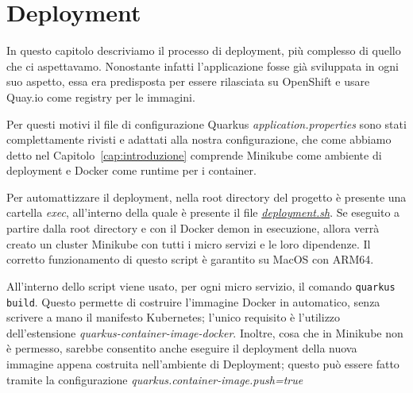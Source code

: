 \chapter{Deployment}
In questo capitolo descriviamo il processo di deployment, più complesso di quello che ci aspettavamo. Nonostante infatti l'applicazione fosse già sviluppata in ogni suo aspetto, essa era predisposta per essere rilasciata su OpenShift e usare Quay.io come registry per le immagini.

Per questi motivi il file di configurazione Quarkus \textit{application.properties} sono stati complettamente rivisti e adattati alla nostra configurazione, che come abbiamo detto nel Capitolo~\ref{cap:introduzione} comprende Minikube come ambiente di deployment e Docker come runtime per i container.

\myskip

Per automattizzare il deployment, nella root directory del progetto è presente una cartella \textit{exec}, all'interno della quale è presente il file \href{https://github.com/edoardosarri24/quarkus-car-rental/blob/master/exec/deployment.sh}{\textit{deployment.sh}}. Se eseguito a partire dalla root directory e con il Docker demon in esecuzione, allora verrà creato un cluster Minikube con tutti i micro servizi e le loro dipendenze. Il corretto funzionamento di questo script è garantito su MacOS con ARM64.

All'interno dello script viene usato, per ogni micro servizio, il comando \texttt{quarkus build}. Questo permette di costruire l'immagine Docker in automatico, senza scrivere a mano il manifesto Kubernetes; l'unico requisito è l'utilizzo dell'estensione \textit{quarkus-container-image-docker}. Inoltre, cosa che in Minikube non è permesso, sarebbe consentito anche eseguire il deployment della nuova immagine appena costruita nell'ambiente di Deployment; questo può essere fatto tramite la configurazione \textit{quarkus.container-image.push=true}

